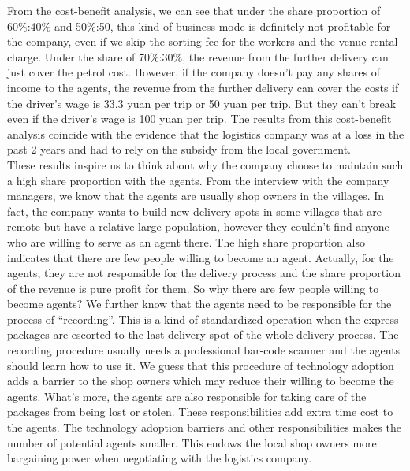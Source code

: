 \documentclass{article}
\begin{document}
    
\mbox{\hspace{2em}} 
From the cost-benefit analysis, we can see that under the share proportion of 60\%:40\% and 50\%:50, this kind of business mode is definitely not profitable for the company, even if we skip the sorting fee for the workers and the venue rental charge. Under the share of 70\%:30\%, the revenue from the further delivery can just cover the petrol cost. However, if the company doesn’t pay any shares of income to the agents, the revenue from the further delivery can cover the costs if the driver’s wage is 33.3 yuan per trip or 50 yuan per trip. But they can’t break even if the driver’s wage is 100 yuan per trip. The results from this cost-benefit analysis coincide with the evidence that the logistics company was at a loss in the past 2 years and had to rely on the subsidy from the local government. \\
\mbox{\hspace{2em}}
These results inspire us to think about why the company choose to maintain such a high share proportion with the agents. From the interview with the company managers, we know that the agents are usually shop owners in the villages. In fact, the company wants to build new delivery spots in some villages that are remote but have a relative large population, however they couldn’t find anyone who are willing to serve as an agent there. The high share proportion also indicates that there are few people willing to become an agent. Actually, for the agents, they are not responsible for the delivery process and the share proportion of the revenue is pure profit for them. So why there are few people willing to become agents? We further know that the agents need to be responsible for the process of “recording”. This is a kind of standardized operation when the express packages are escorted to the last delivery spot of the whole delivery process. The recording procedure usually needs a professional bar-code scanner and the agents should learn how to use it. We guess that this procedure of technology adoption adds a barrier to the shop owners which may reduce their willing to become the agents. What’s more, the agents are also responsible for taking care of the packages from being lost or stolen. These responsibilities add extra time cost to the agents. The technology adoption barriers and other responsibilities makes the number of potential agents smaller. This endows the local shop owners more bargaining power when negotiating with the logistics company.\\
\mbox{\hspace{2em}}
\end{document}
